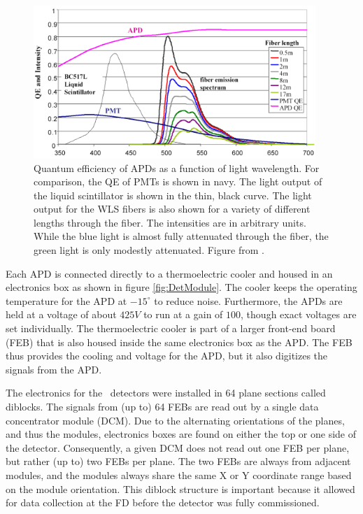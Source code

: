 \begin{figure}[htb]
  \centering
  \includegraphics[width=0.95\textwidth]{figures/APDvsPMT.png}
  \caption[Quantum Efficiency of APDs and Light Intensity Output of WLS fibers]{Quantum efficiency of APDs as a function of light wavelength. For comparison, the QE of PMTs is shown in navy. The light output of the liquid scintillator is shown in the thin, black curve. The light output for the WLS fibers is also shown for a variety of different lengths through the fiber. The intensities are in arbitrary units. While the blue light is almost fully attenuated through the fiber, the green light is only modestly attenuated. Figure from \cite{ref:TDRNOvA}.}
  \label{fig:APDvsPMT}
\end{figure}

Each APD is connected directly to a thermoelectric cooler and housed in an electronics box as shown in figure \ref{fig:DetModule}. The cooler keeps the operating temperature for the APD at $-15^\circ$ to reduce noise. Furthermore, the APDs are held at a voltage of about $425\unit{V}$ to run at a gain of $100$, though exact voltages are set individually. The thermoelectric cooler is part of a larger front-end board (FEB) that is also housed inside the same electronics box as the APD. The FEB thus provides the cooling and voltage for the APD, but it also digitizes the signals from the APD.

The electronics for the \nova~detectors were installed in 64 plane sections called diblocks. The signals from (up to) 64 FEBs are read out by a single data concentrator module (DCM). Due to the alternating orientations of the planes, and thus the modules, electronics boxes are found on either the top or one side of the detector. Consequently, a given DCM does not read out one FEB per plane, but rather (up to) two FEBs per plane. The two FEBs are always from adjacent modules, and the modules always share the same X or Y coordinate range based on the module orientation. This diblock structure is important because it allowed for data collection at the FD before the detector was fully commissioned.